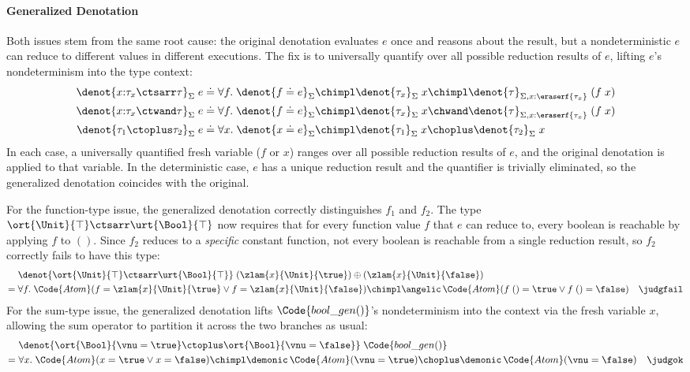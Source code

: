\paragraph{Generalized Denotation}
Both issues stem from the same root cause: the original denotation
evaluates $e$ once and reasons about the result, but a
nondeterministic $e$ can reduce to different values in different
executions.  The fix is to universally quantify over all possible
reduction results of $e$, lifting $e$'s nondeterminism into the
type context:
\begin{align*}
  \denot{x{:}\tau_x \ctsarr \tau}_\Sigma\;e
    &\doteq \forall f.\; \denot{f \doteq e}_\Sigma \chimpl
             \denot{\tau_x}_\Sigma\;x \chimpl
             \denot{\tau}_{\Sigma,x{:}\eraserf{\tau_x}}\;(f\;x)
  \\\denot{x{:}\tau_x \ctwand \tau}_\Sigma\;e
    &\doteq \forall f.\; \denot{f \doteq e}_\Sigma \chimpl
             \denot{\tau_x}_\Sigma\;x \chwand
             \denot{\tau}_{\Sigma,x{:}\eraserf{\tau_x}}\;(f\;x)
  \\\denot{\tau_1 \ctoplus \tau_2}_\Sigma\;e
    &\doteq \forall x.\; \denot{x \doteq e}_\Sigma \chimpl
             \denot{\tau_1}_\Sigma\;x \choplus \denot{\tau_2}_\Sigma\;x
\end{align*}
In each case, a universally quantified fresh variable ($f$ or $x$)
ranges over all possible reduction results of $e$, and the original
denotation is applied to that variable.  In the deterministic case,
$e$ has a unique reduction result and the quantifier is trivially
eliminated, so the generalized denotation coincides with the original.

For the function-type issue, the generalized denotation correctly
distinguishes $f_1$ and $f_2$.  The type
$\ort{\Unit}{\top} \ctsarr \urt{\Bool}{\top}$ now requires that for
every function value $f$ that $e$ can reduce to, every boolean is
reachable by applying $f$ to $()$.  Since $f_2$ reduces to a
\emph{specific} constant function, not every boolean is reachable from
a single reduction result, so $f_2$ correctly fails to have this type:
\begin{align*}
  &\denot{\ort{\Unit}{\top} \ctsarr \urt{\Bool}{\top}}\;
    (\zlam{x}{\Unit}{\true}) \oplus (\zlam{x}{\Unit}{\false})
  \\=\;& \forall f.\; \Code{Atom}(f = \zlam{x}{\Unit}{\true} \lor
          f = \zlam{x}{\Unit}{\false}) \chimpl
          \angelic\,\Code{Atom}(f\;() = \true \lor f\;() = \false)
  \quad\judgfail
\end{align*}
For the sum-type issue, the generalized denotation lifts
$\Code{bool\_gen()}$'s nondeterminism into the context via the fresh
variable $x$, allowing the sum operator to partition it across the
two branches as usual:
\begin{align*}
  &\denot{\ort{\Bool}{\vnu = \true} \ctoplus
          \ort{\Bool}{\vnu = \false}}\;\Code{bool\_gen()}
  \\=\;& \forall x.\; \Code{Atom}(x = \true \lor x = \false) \chimpl
          \demonic\,\Code{Atom}(\vnu = \true) \choplus
          \demonic\,\Code{Atom}(\vnu = \false)
  \quad\judgok
\end{align*}


